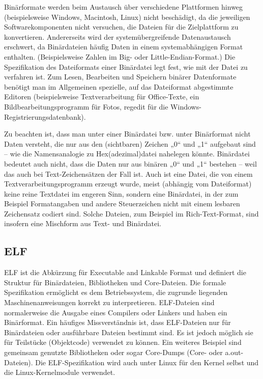 Binärformate werden beim Austausch über verschiedene Plattformen hinweg (beispielsweise Windows, Macintosh, Linux) nicht beschädigt, da die jeweiligen Softwarekomponenten nicht versuchen, die Dateien für die Zielplattform zu konvertieren. Andererseits wird der systemübergreifende Datenaustausch erschwert, da Binärdateien häufig Daten in einem systemabhängigen Format enthalten. (Beispielsweise Zahlen im Big- oder Little-Endian-Format.) Die Spezifikation des Dateiformats einer Binärdatei legt fest, wie mit der Datei zu verfahren ist. Zum Lesen, Bearbeiten und Speichern binärer Datenformate benötigt man im Allgemeinen spezielle, auf das Dateiformat abgestimmte Editoren (beispielsweise Textverarbeitung für Office-Texte, ein Bildbearbeitungsprogramm für Fotos, regedit für die Windows-Registrierungsdatenbank).

Zu beachten ist, dass man unter einer Binärdatei bzw. unter Binärformat nicht Daten versteht, die nur aus den (sichtbaren) Zeichen „0“ und „1“ aufgebaut sind – wie die Namensanalogie zu Hex(adezimal)datei nahelegen könnte. Binärdatei bedeutet auch nicht, dass die Daten nur aus binären „0“ und „1“ bestehen – weil das auch bei Text-Zeichensätzen der Fall ist. Auch ist eine Datei, die von einem Textverarbeitungsprogramm erzeugt wurde, meist (abhängig vom Dateiformat) keine reine Textdatei im engeren Sinn, sondern eine Binärdatei, in der zum Beispiel Formatangaben und andere Steuerzeichen nicht mit einem lesbaren Zeichensatz codiert sind. Solche Dateien, zum Beispiel im Rich-Text-Format, sind insofern eine Mischform aus Text- und Binärdatei.\cite{bin_wikipedia}

\subsection{ELF}
ELF ist die Abkürzung für Executable and Linkable Format und definiert die Struktur für Binärdateien, Bibliotheken und Core-Dateien. Die formale Spezifikation ermöglicht es dem Betriebssystem, die zugrunde liegenden Maschinenanweisungen korrekt zu interpretieren. ELF-Dateien sind normalerweise die Ausgabe eines Compilers oder Linkers und haben ein Binärformat.
\newline
\newline
Ein häufiges Missverständnis ist, dass ELF-Dateien nur für Binärdateien oder ausführbare Dateien bestimmt sind. Es ist jedoch möglich sie für Teilstücke (Objektcode) verwendet zu können. Ein weiteres Beispiel sind gemeinsam genutzte Bibliotheken oder sogar Core-Dumps (Core- oder a.out-Dateien). Die ELF-Spezifikation wird auch unter Linux für den Kernel selbst und die Linux-Kernelmodule verwendet.


